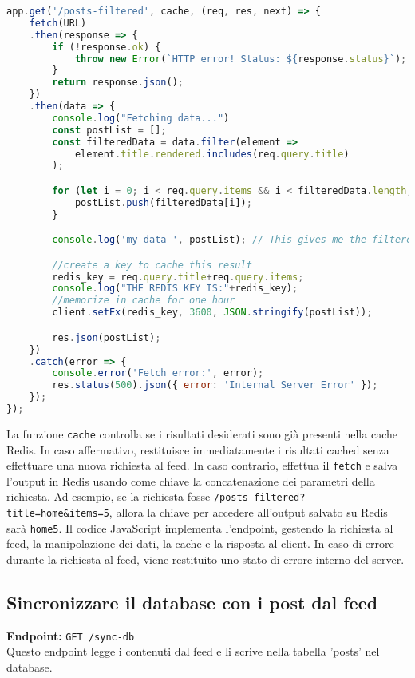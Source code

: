 \documentclass{article}
\begin{document}
\begin{lstlisting}[language=JavaScript, caption={Implementazione dell'endpoint per ottenere i post filtrati}, label={lst:getFilteredPostsEndpoint}]
app.get('/posts-filtered', cache, (req, res, next) => {
    fetch(URL)
    .then(response => {
        if (!response.ok) {
            throw new Error(`HTTP error! Status: ${response.status}`);
        }
        return response.json();
    })
    .then(data => {
        console.log("Fetching data...")
        const postList = [];
        const filteredData = data.filter(element =>
            element.title.rendered.includes(req.query.title)
        );

        for (let i = 0; i < req.query.items && i < filteredData.length; i++) {
            postList.push(filteredData[i]);
        }

        console.log('my data ', postList); // This gives me the filtered posts

        //create a key to cache this result
        redis_key = req.query.title+req.query.items;
        console.log("THE REDIS KEY IS:"+redis_key);
        //memorize in cache for one hour
        client.setEx(redis_key, 3600, JSON.stringify(postList));

        res.json(postList);
    })
    .catch(error => {
        console.error('Fetch error:', error);
        res.status(500).json({ error: 'Internal Server Error' });
    });
});

\end{lstlisting}

La funzione \texttt{cache} controlla se i risultati desiderati sono già presenti nella cache Redis. In caso affermativo, restituisce immediatamente i risultati cached senza effettuare una nuova richiesta al feed. In caso contrario, effettua il \texttt{fetch} e salva l'output in Redis usando come chiave la concatenazione dei parametri della richiesta.
\linebreak
Ad esempio, se la richiesta fosse \texttt{/posts-filtered?title=home\&items=5}, allora la chiave per accedere all'output salvato su Redis sarà \texttt{home5}.
    \linebreak
Il codice JavaScript implementa l'endpoint, gestendo la richiesta al feed, la manipolazione dei dati, la cache e la risposta al client. In caso di errore durante la richiesta al feed, viene restituito uno stato di errore interno del server.



\subsection{Sincronizzare il database con i post dal feed}
\textbf{Endpoint:} \texttt{GET /sync-db}\\
Questo endpoint legge i contenuti dal feed e li scrive nella tabella 'posts' nel database.
\end{document}
